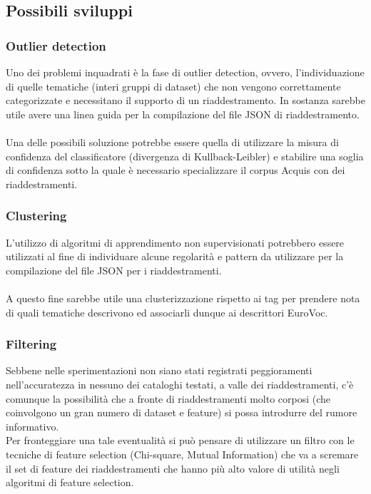 \documentclass{article}
\theoremstyle{plain}
\theoremstyle{definition}
\begin{document}
\subsection{Possibili sviluppi}
\subsubsection{Outlier detection}
Uno dei problemi inquadrati è la fase di outlier detection, ovvero, l'individuazione di quelle tematiche (interi gruppi di dataset) che non vengono correttamente categorizzate e necessitano il supporto di un riaddestramento. In sostanza sarebbe utile avere una linea guida per la compilazione del file JSON di riaddestramento.
\\
\\
Una delle possibili soluzione potrebbe essere quella di utilizzare la misura di confidenza del classificatore (divergenza di Kullback-Leibler) e stabilire una soglia di confidenza sotto la quale è necessario specializzare il corpus Acquis con dei riaddestramenti.

\subsubsection{Clustering}
L'utilizzo di algoritmi di apprendimento non supervisionati potrebbero essere utilizzati al fine di individuare alcune regolarità e pattern da utilizzare per la compilazione del file JSON per i riaddestramenti.
\\
\\
A questo fine sarebbe utile una clusterizzazione rispetto ai tag per prendere nota di quali tematiche descrivono ed associarli dunque ai descrittori EuroVoc.

\subsubsection{Filtering}
Sebbene nelle sperimentazioni non siano stati registrati peggioramenti nell'accuratezza in nessuno dei cataloghi testati, a valle dei riaddestramenti, c'è comunque la possibilità che a fronte di riaddestramenti molto corposi (che coinvolgono un gran numero di dataset e feature) si possa introdurre del rumore informativo.
\\
Per fronteggiare una tale eventualità si può pensare di utilizzare un filtro con le tecniche di feature selection (Chi-square, Mutual Information) che va a scremare il set di feature dei riaddestramenti che hanno più alto valore di utilità negli algoritmi di feature selection.
\end{document}
